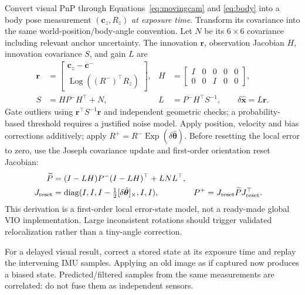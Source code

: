 \documentclass[11pt,a4paper]{article}
\newcommand{\sk}[1]{[#1]_\times}
\DeclareMathOperator{\Exp}{Exp}
\DeclareMathOperator{\Log}{Log}
\begin{document}
Convert visual PnP through Equations~\eqref{eq:movingcam} and
\eqref{eq:body} into a body pose measurement
$(\bm{c}_z,R_z)$ \emph{at exposure time}.
Transform its covariance into the same world-position/body-angle convention.
Let $N$ be its $6\times6$ covariance including relevant anchor uncertainty.
The innovation $\bm{r}$, observation Jacobian $H$, innovation covariance
$S$, and gain $L$ are
\begin{align}
\bm{r}&=\begin{bmatrix}
\bm{c}_z-\bm{c}^-\\ \Log((R^-)^\top R_z)
\end{bmatrix},&
H&=\begin{bmatrix}I&0&0&0&0\\0&0&I&0&0\end{bmatrix},\\
S&=HP^-H^\top+N,&
L&=P^-H^\top S^{-1},\qquad
\delta\hat{\bm{x}}=L\bm{r}.
\end{align}
Gate outliers using $\bm{r}^\top S^{-1}\bm{r}$ and independent geometric
checks; a probability-based threshold requires a justified noise model.
Apply position, velocity and bias corrections additively; apply
$R^+=R^-\Exp(\delta\hat{\bm{\theta}})$.
Before resetting the local error to zero, use the Joseph covariance update
and first-order orientation reset Jacobian:
\begin{align}
\widetilde P&=(I-LH)P^-(I-LH)^\top+LNL^\top,\\
J_{\rm reset}&=\operatorname{diag}
(I,I,I-\tfrac12\sk{\delta\hat{\bm{\theta}}},I,I),&
P^+&=J_{\rm reset}\widetilde P J_{\rm reset}^\top.
\end{align}
This derivation is a first-order local error-state model, not a ready-made
global VIO implementation. Large inconsistent rotations should trigger
validated relocalization rather than a tiny-angle correction.

For a delayed visual result, correct a stored state at its exposure time and
replay the intervening IMU samples. Applying an old image as if captured
now produces a biased state. Predicted/filtered samples from the same
measurements are correlated: do not fuse them as independent sensors.
\end{document}
